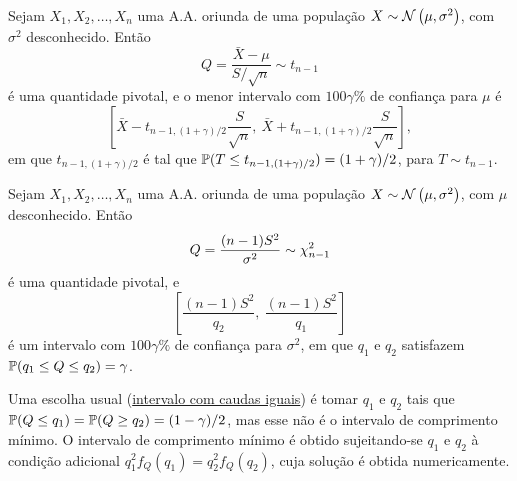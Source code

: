 \begin{theorem}
Sejam $X_1,X_2,\ldots,X_n$ uma A.A. oriunda de uma população $X\sim\normdist{\mu,\sigma^2}$, com $\sigma^2$ desconhecido. Então
\begin{equation}
Q = \frac{\bar{X}-\mu}{S/\sqrt{n}} \sim t_{n-1}
\end{equation}
é uma quantidade pivotal, e o menor intervalo com $100\gamma\%$ de confiança para $\mu$ é
\begin{equation}
\left[\bar{X}-t_{n-1,(1+\gamma)/2}\frac{S}{\sqrt{n}},\ \bar{X}+t_{n-1,(1+\gamma)/2}\frac{S}{\sqrt{n}}\right],
\end{equation}
em que $t_{n-1,(1+\gamma)/2}$ é tal que $\P(T\leq t_{n-1,(1+\gamma)/2})=(1+\gamma)/2$, para $T\sim t_{n-1}$.
\end{theorem}

\begin{theorem}
Sejam $X_1,X_2,\ldots,X_n$ uma A.A. oriunda de uma população $X\sim\normdist{\mu,\sigma^2}$, com $\mu$ desconhecido. Então
\begin{equation}
Q = \frac{(n-1)S^2}{\sigma^2} \sim \chidist{n-1}
\end{equation}
é uma quantidade pivotal, e
\begin{equation}
\left[\frac{(n-1)S^2}{q_2},\ \frac{(n-1)S^2}{q_1}\right]
\end{equation}
é um intervalo com $100\gamma\%$ de confiança para $\sigma^2$, em que $q_1$ e $q_2$ satisfazem $\P(q_1\leq Q\leq q_2)=\gamma$.
\begin{outline}
	\1 Uma escolha usual (\underline{intervalo com caudas iguais}) é tomar $q_1$ e $q_2$ tais que $\P(Q\leq q_1)=\P(Q\geq q_2)=(1-\gamma)/2$, mas esse não é o intervalo de comprimento mínimo.
	\1 O intervalo de comprimento mínimo é obtido sujeitando-se $q_1$ e $q_2$ à condição adicional $q_1^2f_Q(q_1)=q_2^2f_Q(q_2)$, cuja solução é obtida numericamente.
\end{outline}
\end{theorem}

